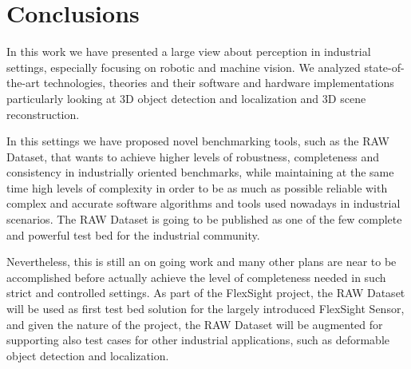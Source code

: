\chapter{Conclusions}\label{ch:conclusions}
In this work we have presented a large view about perception in industrial settings, especially focusing on robotic and machine vision. We analyzed state-of-the-art technologies, theories and their software and hardware implementations particularly looking at 3D object detection and localization and 3D scene reconstruction.

In this settings we have proposed novel benchmarking tools, such as the RAW Dataset, that wants to achieve higher levels of robustness, completeness and consistency in industrially oriented benchmarks, while maintaining at the same time high levels of complexity in order to be as much as possible reliable with complex and accurate software algorithms and tools used nowadays in industrial scenarios. The RAW Dataset is going to be published as one of the few complete and powerful test bed for the industrial community.

Nevertheless, this is still an on going work and many other plans are near to be accomplished before actually achieve the level of completeness needed in such strict and controlled settings. As part of the FlexSight project, the RAW Dataset will be used as first test bed solution for the largely introduced FlexSight Sensor, and given the nature of the project, the RAW Dataset will be augmented for supporting also test cases for other industrial applications, such as deformable object detection and localization.

\newpage

